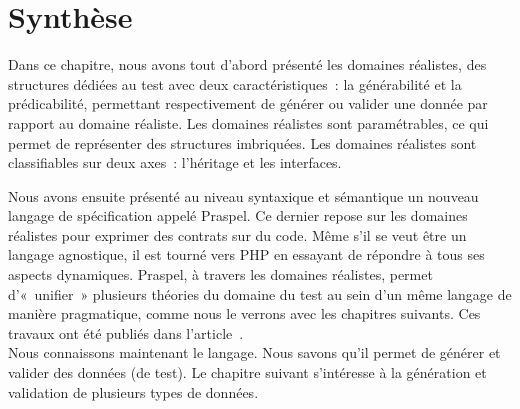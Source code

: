 \section{Synthèse}
\label{section:language:summary}

Dans ce chapitre, nous avons tout d'abord présenté les domaines réalistes, des
structures dédiées au test avec deux caractéristiques~: la générabilité et la
prédicabilité, permettant respectivement de générer ou valider une donnée par
rapport au domaine réaliste. Les domaines réalistes sont paramétrables, ce qui
permet de représenter des structures imbriquées. Les domaines réalistes sont
classifiables sur deux axes~: l'héritage et les interfaces.

Nous avons ensuite présenté au niveau syntaxique et sémantique un nouveau
langage de spécification appelé Praspel. Ce dernier repose sur les domaines
réalistes pour exprimer des contrats sur du code. Même s'il se veut être un
langage agnostique, il est tourné vers PHP en essayant de répondre à tous ses
aspects dynamiques. Praspel, à travers les domaines réalistes, permet
d'«~unifier~» plusieurs théories du domaine du test au sein d'un même langage de
manière pragmatique, comme nous le verrons avec les chapitres suivants. Ces
travaux ont été publiés dans l'article~. \\

Nous connaissons maintenant le langage. Nous savons qu'il permet de générer et
valider des données (de test). Le chapitre suivant s'intéresse à la génération
et validation de plusieurs types de données.
